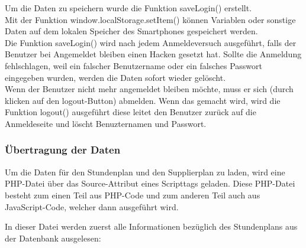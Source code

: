 Um die Daten zu speichern wurde die Funktion saveLogin() erstellt.\\




Mit der Funktion window.localStorage.setItem() können Variablen oder sonstige Daten auf dem lokalen Speicher des Smartphones gespeichert werden.\\
 Die Funktion saveLogin() wird nach jedem Anmeldeversuch ausgeführt, falls der Benutzer bei Angemeldet bleiben einen Hacken gesetzt hat. Sollte die Anmeldung fehlschlagen, weil ein falscher Benutzername oder ein falsches Passwort eingegeben wurden, werden die Daten sofort wieder gelöscht.\\
Wenn der Benutzer nicht mehr angemeldet bleiben möchte, muss er sich (durch klicken auf den logout-Button) abmelden. Wenn das gemacht wird, wird die Funktion logout() ausgeführt diese leitet den Benutzer zurück auf die Anmeldeseite und löscht Benuzternamen und Passwort.\\



\subsubsection{Übertragung der Daten}

Um die Daten für den Stundenplan und den Supplierplan zu laden, wird eine PHP-Datei über das Source-Attribut eines Scripttags geladen. Diese PHP-Datei besteht zum einen Teil aus PHP-Code und zum anderen Teil auch aus JavaScript-Code, welcher dann ausgeführt wird.



In dieser Datei werden zuerst alle Informationen bezüglich des Stundenplans aus der Datenbank ausgelesen:



